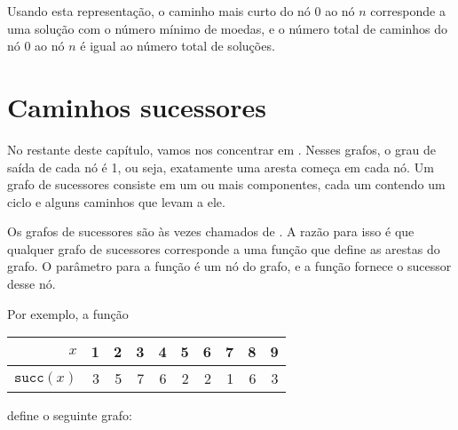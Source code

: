 Usando esta representação,
o caminho mais curto do nó 0 ao nó $n$
corresponde a uma solução com o número mínimo de moedas,
e o número total de caminhos do nó 0 ao nó $n$
é igual ao número total de soluções.

\section{Caminhos sucessores}


No restante deste capítulo,
vamos nos concentrar em .
Nesses grafos,
o grau de saída de cada nó é 1, ou seja,
exatamente uma aresta começa em cada nó.
Um grafo de sucessores consiste em um ou mais
componentes, cada um contendo
um ciclo e alguns caminhos que levam a ele.

Os grafos de sucessores são às vezes chamados
de .
A razão para isso é que qualquer grafo de sucessores
corresponde a uma função que define
as arestas do grafo.
O parâmetro para a função é um nó do grafo,
e a função fornece o sucessor desse nó.

Por exemplo, a função
\begin{center}
\begin{tabular}{r|rrrrrrrrr}
$x$ & 1 & 2 & 3 & 4 & 5 & 6 & 7 & 8 & 9 \\
\hline
$\texttt{succ}(x)$ & 3 & 5 & 7 & 6 & 2 & 2 & 1 & 6 & 3 \\
\end{tabular}
\end{center}
define o seguinte grafo:
\begin{center}
\end{center}

